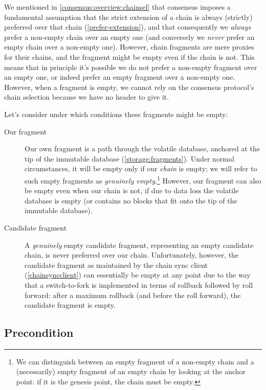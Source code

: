 We mentioned in \cref{consensus:overview:chainsel} that consensus imposes a
fundamental assumption that the strict extension of a chain is always (strictly)
preferred over that chain (\cref{prefer-extension}), and that consequently we
\emph{always} prefer a non-empty chain over an empty one (and conversely we
\emph{never} prefer an empty chain over a non-empty one). However, chain
fragments are mere proxies for their chains, and the fragment might be empty
even if the chain is not. This means that in principle it's possible we do not
prefer a non-empty fragment over an empty one, or indeed prefer an empty
fragment over a non-empty one. However, when a fragment is empty, we cannot rely
on the consensus protocol's chain selection because we have no header to give
it.

Let's consider under which conditions these fragments might be empty:

\begin{description}
\item[Our fragment]
Our own fragment is a path through the volatile database, anchored at the tip of
the immutable database (\cref{storage:fragments}). Under normal circumstances,
it will be empty only if our \emph{chain} is empty; we will refer to such empty
fragments as \emph{genuinely empty}.\footnote{We can distinguish between an empty
fragment of a non-empty chain and a (necessarily) empty fragment of an empty
chain by looking at the anchor point: if it is the genesis point, the chain must
be empty.} However, our fragment can also be empty even when our chain is not,
if due to data loss the volatile database is empty (or contains no blocks that
fit onto the tip of the immutable database).

\item[Candidate fragment]
A \emph{genuinely} empty candidate fragment, representing an empty candidate
chain, is never preferred over our chain. Unfortunately, however, the candidate
fragment as maintained by the chain sync client (\cref{chainsyncclient}) can
essentially be empty at any point due to the way that a switch-to-fork is
implemented in terms of rollback followed by roll forward: after a maximum
rollback (and before the roll forward), the candidate fragment is empty.
\end{description}

\subsection{Precondition}
\label{chainsel:fragments:precondition}

